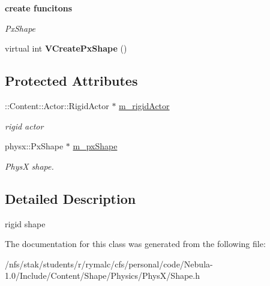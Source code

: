 \begin{Indent}{\bf create funcitons}\par
{\em \label{_amgrp6b23793a22eaab4b0141b8612189f046}
 PxShape }\begin{DoxyCompactItemize}
\item 
\hypertarget{classContent_1_1Shape_1_1Shape_a785366e994eb4d7365357f69d1e5513a}{
virtual int {\bfseries VCreatePxShape} ()}
\label{classContent_1_1Shape_1_1Shape_a785366e994eb4d7365357f69d1e5513a}

\end{DoxyCompactItemize}
\end{Indent}
\subsection*{Protected Attributes}
\begin{DoxyCompactItemize}
\item 
\hypertarget{classContent_1_1Shape_1_1Shape_a7f9b9bb2bdae8da6c508df3f55d11074}{
::Content::Actor::RigidActor $\ast$ \hyperlink{classContent_1_1Shape_1_1Shape_a7f9b9bb2bdae8da6c508df3f55d11074}{m\_\-rigidActor}}
\label{classContent_1_1Shape_1_1Shape_a7f9b9bb2bdae8da6c508df3f55d11074}

\begin{DoxyCompactList}\small\item\em rigid actor \item\end{DoxyCompactList}\item 
\hypertarget{classContent_1_1Shape_1_1Shape_a3b4d91b06941bca4647e9ce8e23159e5}{
physx::PxShape $\ast$ \hyperlink{classContent_1_1Shape_1_1Shape_a3b4d91b06941bca4647e9ce8e23159e5}{m\_\-pxShape}}
\label{classContent_1_1Shape_1_1Shape_a3b4d91b06941bca4647e9ce8e23159e5}

\begin{DoxyCompactList}\small\item\em PhysX shape. \item\end{DoxyCompactList}\end{DoxyCompactItemize}


\subsection{Detailed Description}
rigid shape 

The documentation for this class was generated from the following file:\begin{DoxyCompactItemize}
\item 
/nfs/stak/students/r/rymalc/cfs/personal/code/Nebula-\/1.0/Include/Content/Shape/Physics/PhysX/Shape.h\end{DoxyCompactItemize}
